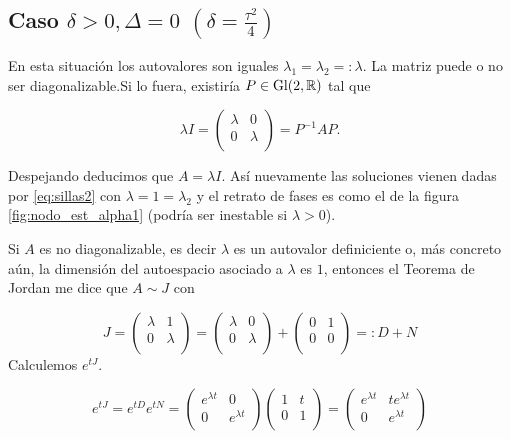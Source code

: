 \subsection{Caso $\delta>0, \Delta=0$ $(\delta=\frac{\tau^2}{4})$}

En esta situación los autovalores son iguales $\lambda_1=\lambda_2=:\lambda$. La matriz puede o no ser diagonalizable.Si lo fuera, existiría $P\in \operatorname{Gl}(2,\mathbb{R})$ tal que

\[
 \lambda I=
 \begin{pmatrix}
  \lambda & 0\\
  0  & \lambda\\
 \end{pmatrix}
=P^{-1}AP.
\]

Despejando deducimos que $A=\lambda I$. Así nuevamente las soluciones vienen dadas por \eqref{eq:sillas2} con $\lambda=1=\lambda_2$ y el retrato de fases es como el de la figura \ref{fig:nodo_est_alpha1} (podría ser inestable si $\lambda>0$). 

Si $A$ es no diagonalizable, es decir $\lambda$ es un autovalor definiciente o, más concreto aún, la dimensión del autoespacio asociado a $\lambda$ es $1$, entonces el Teorema de Jordan me dice que $A\sim J$ con

\[
 J=\begin{pmatrix} \lambda & 1\\
    0 & \lambda \\
   \end{pmatrix}=
   \begin{pmatrix} \lambda & 0\\
    0 & \lambda \\
   \end{pmatrix}+
   \begin{pmatrix} 0 & 1\\
    0 & 0 \\
   \end{pmatrix}=:D+N
\]
Calculemos $e^{tJ}$. 

\[ e^{tJ}=e^{tD}e^{tN}
 =\begin{pmatrix} e^{\lambda t} & 0\\
    0 & e^{\lambda t} \\
     \end{pmatrix}
      \begin{pmatrix} 1 & t\\
    0 &  1 \\
   \end{pmatrix} = 
   \begin{pmatrix} e^{\lambda t} & te^{\lambda t} \\
    0 & e^{\lambda t} \\
   \end{pmatrix}
\]

